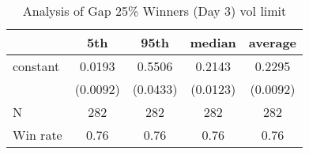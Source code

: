 \documentclass{article}
\begin{document}
\begin{table}
\caption{Analysis of Gap 25\% Winners (Day 3) vol limit}
\begin{center}
\begin{tabular}{lcccc}
\hline
         &   5th    &   95th   &  median  & average   \\
\midrule
\midrule
constant & 0.0193   & 0.5506   & 0.2143   & 0.2295    \\
         & (0.0092) & (0.0433) & (0.0123) & (0.0092)  \\
N        & 282      & 282      & 282      & 282       \\
Win rate & 0.76     & 0.76     & 0.76     & 0.76      \\
\hline
\end{tabular}
\end{center}
\end{table}
\end{document}
